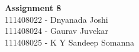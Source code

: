 \documentclass[main.tex]{subfiles}
\begin{document}
\begin{titlepage}

\begin{center}
  \LARGE{\bf{Assignment 8\\}}
  \horrule{0.4pt}
  111408022 - Dnyanada Joshi \\
  111408024 - Gaurav Juvekar \\
  111408025 - K Y Sandeep Somanna \\
\end{center}
\horrule{0.4pt}
\end{titlepage}
\end{document}
